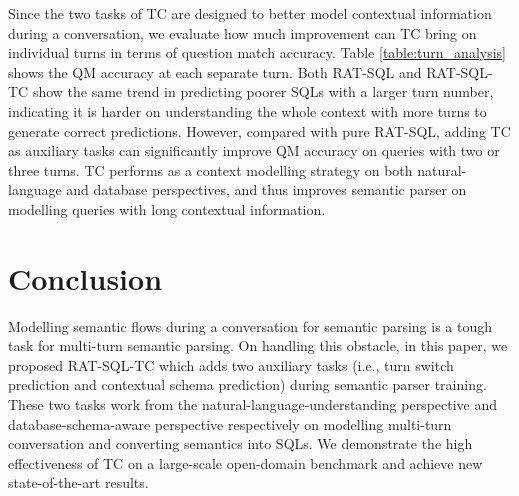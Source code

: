 \documentclass[a4paper]{article}
\begin{document}
Since the two tasks of TC are designed to better model contextual information during a conversation, we evaluate how much improvement can TC bring on individual turns in terms of question match accuracy. Table \ref{table:turn_analysis} shows the QM accuracy at each separate turn. Both RAT-SQL and RAT-SQL-TC show the same trend in predicting poorer SQLs with a larger turn number, indicating it is harder on understanding the whole context with more turns to generate correct predictions. However, compared with pure RAT-SQL, adding TC as auxiliary tasks can significantly improve QM accuracy on queries with two or three turns. TC performs as a context modelling strategy on both natural-language and database perspectives, and thus improves semantic parser on modelling queries with long contextual information.
\begin{table}[htbp]
\centering
{}
\caption{QM accuracy on each separate turn.}
\label{table:turn_analysis}\vspace{-3mm}
\end{table}

\section{Conclusion}

Modelling semantic flows during a conversation for semantic parsing is a tough task for multi-turn semantic parsing. On handling this obstacle, in this paper, we proposed RAT-SQL-TC which adds two auxiliary tasks (i.e., turn switch prediction and contextual schema prediction) during semantic parser training. These two tasks work from the natural-language-understanding perspective and database-schema-aware perspective respectively on modelling multi-turn conversation and converting semantics into SQLs. We demonstrate the high effectiveness of TC on a large-scale open-domain benchmark and achieve new state-of-the-art results.




\end{document}
